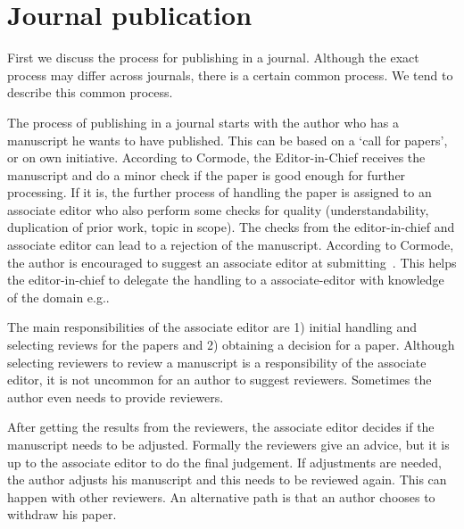\documentclass{ou-report}
\newcommand{\outline}[1]{{\color{blue} #1}}
\begin{document}


\section{Journal publication}

First we discuss the process for publishing in a journal. Although the 
exact process may differ across journals, there is a certain common process. We 
tend to describe this common process.

The process of publishing in a journal starts with the author who has a manuscript 
he wants to have published. This can be based on a `call for papers', or on own 
initiative. According to Cormode, the Editor-in-Chief receives the manuscript 
and do a minor check if the paper is good enough for further processing. If it 
is, the further process of handling the paper is assigned to an associate editor 
who also perform some checks for quality (understandability, duplication of 
prior work, topic in scope). The checks from the editor-in-chief and associate 
editor can lead to a rejection of the manuscript. According to Cormode, the 
author is encouraged to suggest an associate editor at submitting~\cite{C2013}.
This helps the editor-in-chief to delegate the handling to a associate-editor with knowledge of the domain e.g..

The main responsibilities of the associate editor are 1) initial handling and 
selecting reviews for the papers and 2) obtaining a decision for a paper. 
Although selecting reviewers to review a manuscript is a responsibility of the 
associate editor, it is not uncommon for an author to suggest reviewers. 
Sometimes the author even needs to provide reviewers.

After getting the results from the reviewers, the associate editor decides if 
the manuscript needs to be adjusted. Formally the reviewers give an advice, but 
it is up to the associate editor to do the final judgement. If adjustments are 
needed, the author adjusts his manuscript and this needs to be reviewed again. 
This can happen with other reviewers. An alternative path is that an author 
chooses to withdraw his paper.
\end{document}
